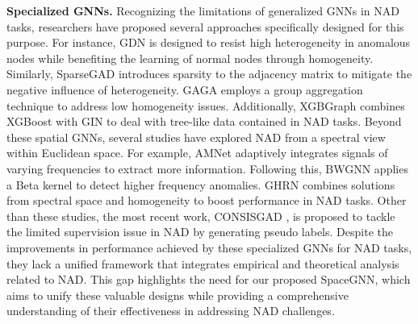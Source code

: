{\bf Specialized GNNs.} Recognizing the limitations of generalized GNNs in NAD tasks, researchers have proposed several approaches specifically designed for this purpose. For instance, GDN \citep{gdn23gao} is designed to resist high heterogeneity in anomalous nodes while benefiting the learning of normal nodes through homogeneity. Similarly, SparseGAD \citep{sparsegad23gong} introduces sparsity to the adjacency matrix to mitigate the negative influence of heterogeneity. GAGA \citep{gaga23wang} employs a group aggregation technique to address low homogeneity issues. Additionally, XGBGraph \citep{gadbench23tang} combines XGBoost with GIN to deal with tree-like data contained in NAD tasks. Beyond these spatial GNNs, several studies have explored NAD from a spectral view within Euclidean space. For example, AMNet \citep{amnet22chai} adaptively integrates signals of varying frequencies to extract more information. Following this, BWGNN \citep{bwgnn22tang} applies a Beta kernel to detect higher frequency anomalies. GHRN \citep{ghrn23gao} combines solutions from spectral space and homogeneity to boost performance in NAD tasks. Other than these studies, the most recent work, CONSISGAD \citep{consisgad24chen}, is proposed to tackle the limited supervision issue in NAD by generating pseudo labels. Despite the improvements in performance achieved by these specialized GNNs for NAD tasks, they lack a unified framework that integrates empirical and theoretical analysis related to NAD. This gap highlights the need for our proposed SpaceGNN, which aims to unify these valuable designs while providing a comprehensive understanding of their effectiveness in addressing NAD challenges.